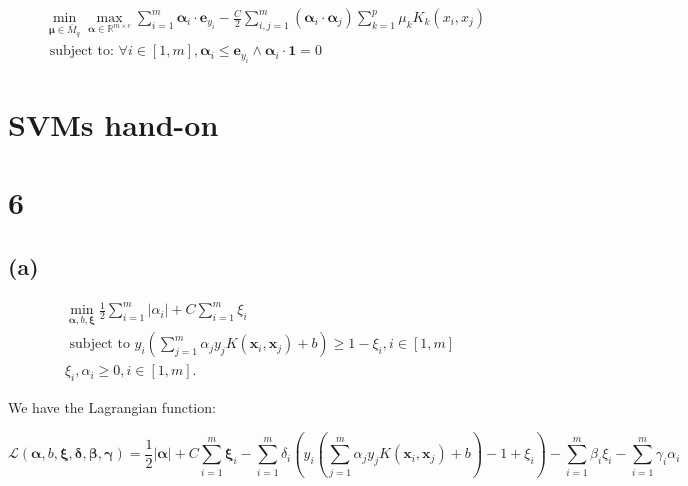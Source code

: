 \documentclass{article}
\begin{document}
\begin{equation}
    \begin{aligned}
    &\min _{\boldsymbol{\mu} \in \bar{M}_{q}} \max _{\boldsymbol{\alpha} \in \mathbb{R}^{m \times c}} \sum_{i=1}^{m} \boldsymbol{\alpha}_{i} \cdot \mathbf{e}_{y_{i}}-\frac{C}{2} \sum_{i, j=1}^{m}\left(\boldsymbol{\alpha}_{i} \cdot \boldsymbol{\alpha}_{j}\right) \sum_{k=1}^{p} \mu_{k} K_{k}\left(x_{i}, x_{j}\right) \\
    &\text { subject to: } \forall i \in[1, m], \boldsymbol{\alpha}_{i} \leq \mathbf{e}_{y_{i}} \wedge \boldsymbol{\alpha}_{i} \cdot \mathbf{1}=0
    \end{aligned}
    \end{equation}




\section*{SVMs hand-on}
\section*{6}
\subsection*{(a)}
\begin{equation}
    \begin{aligned}
        \min _{\boldsymbol{\alpha}, b, \boldsymbol{\xi}} \frac{1}{2} \sum_{i=1}^{m}\left|\alpha_{i}\right|+C \sum_{i=1}^{m} \xi_{i} \\
        \text { subject to } y_{i}\left(\sum_{j=1}^{m} \alpha_{j} y_{j} K\left(\boldsymbol{x}_{i}, \boldsymbol{x}_{j}\right)+b\right) \geq 1-\xi_{i}, i \in[1, m] \\
        \xi_{i}, \alpha_{i} \geq 0, i \in[1, m] .
    \end{aligned}
\end{equation}

We have the Lagrangian function:

\begin{equation}
    \mathcal{L}(\bm{\alpha}, b, \bm{\xi}, \bm{\delta}, \bm{\beta}, \bm{\gamma}) 
    = \frac{1}{2} |\bm{\alpha}|  
    + C \sum_{i=1}^{m} \bm{\xi}_{i} 
    - \sum_{i=1}^{m} 
        \delta_{i}
        \left(
            y_{i}\left(\sum_{j=1}^{m} \alpha_{j} y_{j} K\left(\boldsymbol{x}_{i}, \boldsymbol{x}_{j}\right)+b\right) - 1 + \xi_{i}
        \right) 
    - \sum_{i=1}^{m} \beta_{i} \xi_{i}
    - \sum_{i=1}^{m} \gamma_{i} \alpha_{i}
\end{equation}
\end{document}
